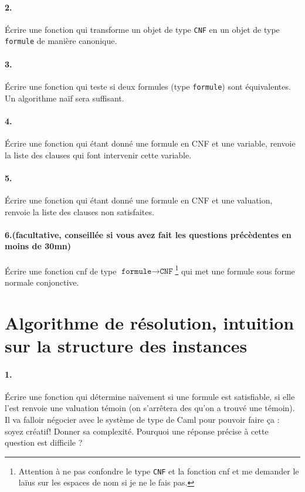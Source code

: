 \documentclass[10pt,a4paper]{article}
\begin{document}
\paragraph{2.} Écrire une fonction qui transforme un objet de type \texttt{CNF} en un objet de type \texttt{formule} de manière canonique. 

\paragraph{3.} Écrire une fonction qui teste si deux formules (type \texttt{formule}) sont équivalentes. Un algorithme naïf sera suffisant.

\paragraph{4.} Écrire une fonction qui étant donné une formule en CNF et une variable, renvoie la liste des clauses qui font intervenir cette variable. 
\paragraph{5.} Écrire une fonction qui étant donné une formule en CNF et une valuation, renvoie la liste des clauses non satisfaites.

\paragraph{6.(facultative, conseillée si vous avez fait les questions précèdentes en moins de 30mn)} Écrire une fonction cnf de type $\texttt{formule} \rightarrow \texttt{CNF}$\footnote{Attention à ne pas confondre le type \texttt{CNF} et la fonction cnf et me demander le laïus sur les espaces de nom si je ne le fais pas.}  qui met une formule sous forme normale conjonctive.

\section{Algorithme de résolution, intuition sur la structure des instances}

\paragraph{1.} Écrire une fonction qui détermine naïvement si une formule est satisfiable, si elle l'est renvoie une valuation témoin (on s'arrêtera des qu'on a trouvé une témoin). Il va falloir négocier avec le système de type de Caml pour pouvoir faire ça : soyez créatif! Donner sa complexité. Pourquoi une réponse précise à cette question est difficile ? 
\end{document}
